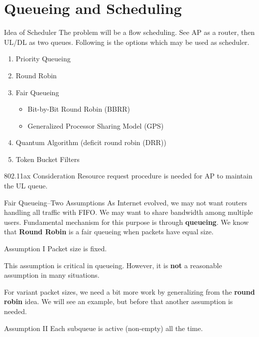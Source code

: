 \documentclass[10pt]{beamer}
\begin{document}
\section{Queueing and Scheduling}
\begin{frame}{Idea of Scheduler}
The problem will be a flow scheduling. See AP as a router, then UL/DL as two queues. 
Following is the options which may be used as scheduler. 
\begin{enumerate}
\item 
	Priority Queueing
\item Round Robin
\item Fair Queueing\\
\begin{itemize}
	\item
	Bit-by-Bit Round Robin (BBRR)
	\item
	Generalized Processor Sharing Model (GPS)
\end{itemize}
\item 
	Quantum Algorithm (deficit round robin (DRR))
\item
	Token Bucket Filters
\end{enumerate}
\alert{802.11ax Consideration} Resource request procedure is needed for AP to maintain the UL queue. 
\end{frame}

\begin{frame}{Fair Queueing--Two Assumptions}
As Internet evolved, we may not want routers handling all traffic with FIFO. 
We may want to share bandwidth among multiple users.
Fundamental mechanism for this purpose is through \textbf{queueing}.
We know that \textbf{Round Robin} is a fair queueing when packets have equal size.
\begin{block}{Assumption I}
Packet size is fixed.
\end{block}
This assumption is critical in queueing. However, it is \textbf{not} a reasonable assumption in many situations.

For variant packet sizes, we need a bit more work by generalizing from the \textbf{round robin} idea. 
We will see an example, but before that another assumption is needed.
\begin{block}{Assumption II}
Each subqueue is active (non-empty) all the time.
\end{block} 
\end{frame}
\end{document}
